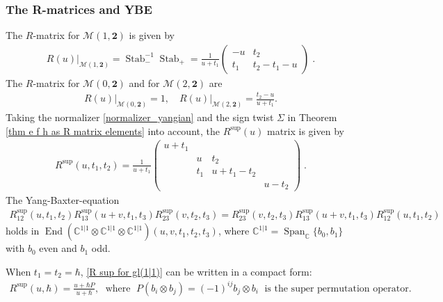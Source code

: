 \documentclass[10pt]{amsart}
\theoremstyle{definition}
\numberwithin{equation}{section}
\newcommand{\bC}{\mathbb{C}}
\newcommand{\cM}{\mathcal{M}}
\newcommand{\End}{\operatorname{End}}
\newcommand{\Span}{\operatorname{Span}}
\newcommand{\Stab}{\operatorname{Stab}}
\begin{document}
\subsubsection{The R-matrices and YBE}
The $R$-matrix for $\cM(1,\mathbf 2)$ is given by
\begin{align*}
R(u)\big|_{\cM(1,\mathbf 2)}=\Stab_-^{-1}\Stab_+=\frac{1}{u+t_1}\begin{pmatrix}
-u & t_2\\
t_1 & t_2-t_1-u
\end{pmatrix}\;.
\end{align*}
The $R$-matrix for $\cM(0,\mathbf 2)$ and for $\cM(2,\mathbf 2)$ are
\begin{align*}
R(u)\big|_{\cM(0,\mathbf 2)}=1,\quad R(u)\big|_{\cM(2,\mathbf 2)}=\frac{t_2-u}{u+t_1}.
\end{align*}
Taking the normalizer \eqref{normalizer_yangian} and the sign twist $\Sigma$ in Theorem \ref{thm e f h as R matrix elements} into account, the $R^{\mathrm{sup}}(u)$ matrix is given by 
\begin{align}\label{R sup for gl(1|1)}
R^{\mathrm{sup}}(u,t_1,t_2)=\frac{1}{u+t_1}\begin{pmatrix}
u+t_1 & & & \\
 &u & t_2 & \\
 & t_1 & u+t_1-t_2 &\\
 & & & u-t_2
\end{pmatrix}\;.
\end{align}
The Yang-Baxter-equation
\begin{align*}
R^{\mathrm{sup}}_{12}(u,t_1,t_2)R^{\mathrm{sup}}_{13}(u+v,t_1,t_3)R^{\mathrm{sup}}_{23}(v,t_2,t_3)=R^{\mathrm{sup}}_{23}(v,t_2,t_3)R^{\mathrm{sup}}_{13}(u+v,t_1,t_3)R^{\mathrm{sup}}_{12}(u,t_1,t_2)
\end{align*}
holds in $\End(\bC^{1|1}\otimes \bC^{1|1}\otimes\bC^{1|1})(u,v,t_1,t_2,t_3)$, where $\bC^{1|1}=\Span_\bC\{b_0,b_1\}$ with $b_0$ even and $b_1$ odd.

When $t_1=t_2=\hbar$, \eqref{R sup for gl(1|1)} can be written in a compact form:
\begin{align}\label{fund geom R-mat 1|1}
R^{\mathrm{sup}}(u,\hbar)=\frac{u+\hbar P}{u+\hbar},\;\text{ where }\;P(b_i\otimes b_j)=(-1)^{ij}b_j\otimes b_i\;\text{ is the super permutation operator}.
\end{align}
\end{document}
